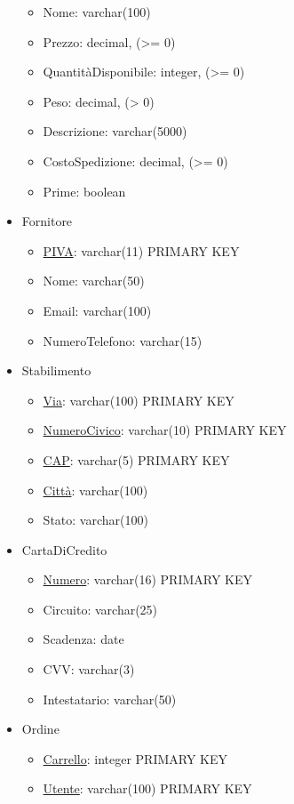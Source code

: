 \documentclass[11pt]{article}
\begin{document}
\begin{itemize}
\begin{itemize}
        \item Nome: varchar(100)
        \item Prezzo: decimal, (\textgreater{}= 0)
        \item QuantitàDisponibile: integer, (\textgreater{}= 0)
        \item Peso: decimal, (\textgreater{} 0)
        \item Descrizione: varchar(5000)
        \item CostoSpedizione: decimal, (\textgreater{}= 0)
        \item Prime: boolean
    \end{itemize}
    \item Fornitore
    \begin{itemize}
        \item \underline{PIVA}: varchar(11) PRIMARY KEY
        \item Nome: varchar(50)
        \item Email: varchar(100)
        \item NumeroTelefono: varchar(15)
    \end{itemize}
    \item Stabilimento
    \begin{itemize}
        \item \underline{Via}: varchar(100) PRIMARY KEY
        \item \underline{NumeroCivico}: varchar(10) PRIMARY KEY
        \item \underline{CAP}: varchar(5) PRIMARY KEY
        \item \underline{Città}: varchar(100)
        \item Stato: varchar(100)
    \end{itemize}
    \item CartaDiCredito
    \begin{itemize}
        \item \underline{Numero}: varchar(16) PRIMARY KEY
        \item Circuito: varchar(25)
        \item Scadenza: date
        \item CVV: varchar(3)
        \item Intestatario: varchar(50)
    \end{itemize}
    \item Ordine
    \begin{itemize}
        \item \underline{Carrello}: integer PRIMARY KEY
        \item \underline{Utente}: varchar(100) PRIMARY KEY

\end{itemize}
\end{itemize}
\end{document}
